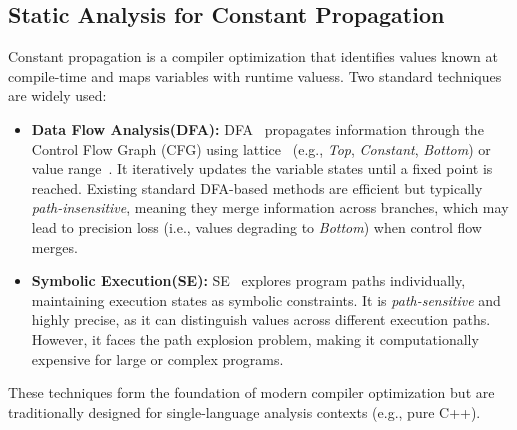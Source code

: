 \subsection{Static Analysis for Constant Propagation}

Constant propagation is a compiler optimization that identifies values known at compile-time and maps variables with runtime valuess. 
Two standard techniques are widely used:

\begin{itemize}
    \item \textbf{Data Flow Analysis(DFA):} DFA~\cite{wegman1991sccp,callahan1986icp,Sui2016SVFInterproceduralStatic} propagates information through the Control Flow Graph (CFG) using lattice~\cite{Kildall1973lattice} (e.g., \textit{Top}, \textit{Constant}, \textit{Bottom}) or value range~\cite{patterson1995valuerange}. 
    It iteratively updates the variable states until a fixed point is reached.
    Existing standard DFA-based methods are efficient but typically \textit{path-insensitive}, meaning they merge information across branches, which may lead to precision loss (i.e., values degrading to \textit{Bottom}) when control flow merges.
    
    \item \textbf{Symbolic Execution(SE):} SE~\cite{Cadar2008KLEEUnassistedAutomatic,Yao2024FalconFusedApproach} explores program paths individually, maintaining execution states as symbolic constraints. 
    It is \textit{path-sensitive} and highly precise, as it can distinguish values across different execution paths. 
    However, it faces the path explosion problem, making it computationally expensive for large or complex programs.
\end{itemize}

These techniques form the foundation of modern compiler optimization but are traditionally designed for single-language analysis contexts (e.g., pure C++).